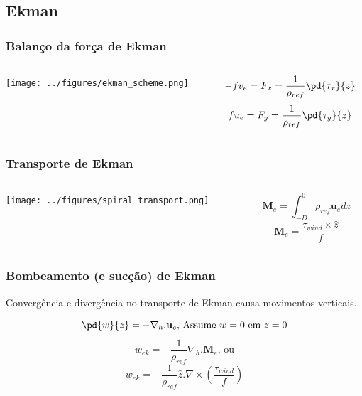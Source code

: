 \subsection{Ekman}
\begin{frame}
  \frametitle{Balanço da força de Ekman}
  \begin{columns}
    \begin{column}{0.5\textwidth}
      \begin{center}
        \texttt{[image: ../figures/ekman\_scheme.png]}
      \end{center}
    \end{column}
    \begin{column}{0.5\textwidth}
      \[
        -fv_e = F_x = \frac{1}{\rho_{ref}}\pd{\tau_x}{z}
      \]
      \[
        fu_e = F_y = \frac{1}{\rho_{ref}}\pd{\tau_y}{z}
      \]
    \end{column}  \end{columns}
\end{frame}


\begin{frame}
  \frametitle{Transporte de Ekman}
  \begin{columns}
    \begin{column}{0.5\textwidth}
      \begin{center}
        \texttt{[image: ../figures/spiral\_transport.png]}
      \end{center}
    \end{column}
    \begin{column}{0.5\textwidth}
      \[
        \mathbf{M}_e = \int_{-D}^0 \rho_{ref}\mathbf{u}_edz
      \]
      \[
        \mathbf{M}_e = \frac{\tau_{wind} \times \hat{z}}{f}
      \]
    \end{column}  \end{columns}
\end{frame}


\begin{frame}
  \frametitle{Bombeamento (e sucção) de Ekman}
  Convergência e divergência no transporte de Ekman causa movimentos verticais.
  \begin{block}{}
    \[
      \pd{w}{z} = -\nabla_h . \mathbf{u}_e \text{, Assume }w=0 \text{ em } z=0
    \]
    \[
      w_{ek} = -\frac{1}{\rho_{ref}}\nabla_h . \mathbf{M}_e \text{, ou}
    \]
    \[
      w_{ek} = -\frac{1}{\rho_{ref}}\hat{z} . \nabla \times \left( \frac{\tau_{wind}}{f} \right)
    \]
  \end{block}
\end{frame}

